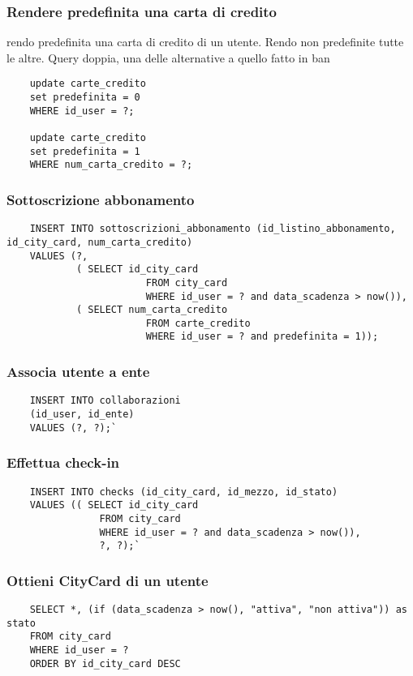 \subsubsection{Rendere predefinita una carta di credito}
rendo predefinita una carta di credito di un utente. Rendo non predefinite tutte le altre. Query doppia, una delle alternative a quello fatto in ban
\begin{lstlisting}
    update carte_credito
    set predefinita = 0
    WHERE id_user = ?;

    update carte_credito
    set predefinita = 1
    WHERE num_carta_credito = ?;
\end{lstlisting}

\subsubsection{Sottoscrizione abbonamento}
\begin{lstlisting}
    INSERT INTO sottoscrizioni_abbonamento (id_listino_abbonamento, id_city_card, num_carta_credito) 
    VALUES (?, 
            ( SELECT id_city_card
                        FROM city_card
                        WHERE id_user = ? and data_scadenza > now()), 
            ( SELECT num_carta_credito 
                        FROM carte_credito
                        WHERE id_user = ? and predefinita = 1));
\end{lstlisting}

\subsubsection{Associa utente a ente}
\begin{lstlisting}
    INSERT INTO collaborazioni 
    (id_user, id_ente) 
    VALUES (?, ?);`
\end{lstlisting}

\subsubsection{Effettua check-in}
\begin{lstlisting}
    INSERT INTO checks (id_city_card, id_mezzo, id_stato) 
    VALUES (( SELECT id_city_card
                FROM city_card
                WHERE id_user = ? and data_scadenza > now()), 
                ?, ?);`
\end{lstlisting}

\subsubsection{Ottieni CityCard di un utente}
\begin{lstlisting}
    SELECT *, (if (data_scadenza > now(), "attiva", "non attiva")) as stato
    FROM city_card 
    WHERE id_user = ?
    ORDER BY id_city_card DESC
\end{lstlisting}

